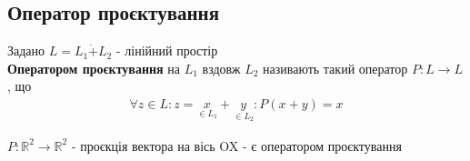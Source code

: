 \documentclass[a4paper, 10pt]{article}
\theoremstyle{theoremdd}
\begin{document}

\iffalse
\subsection{Оператор проєктування}
 Задано $L = L_1 \dot{+} L_2$ - лінійний простір\\
\textbf{Оператором проєктування} на $L_1$ вздовж $L_2$ називають такий оператор $P: L \to L$, що
\begin{align*}
\forall z \in L: z = \underset{\in L_1}{x}+\underset{\in L_2}{y}: P(x+y) = x
\end{align*}

 $P: \mathbb{R}^2 \to \mathbb{R}^2$ - проєкція вектора на вісь OX - є оператором проєктування
\begin{figure}[H]
\centering
\end{figure}
\end{document}
